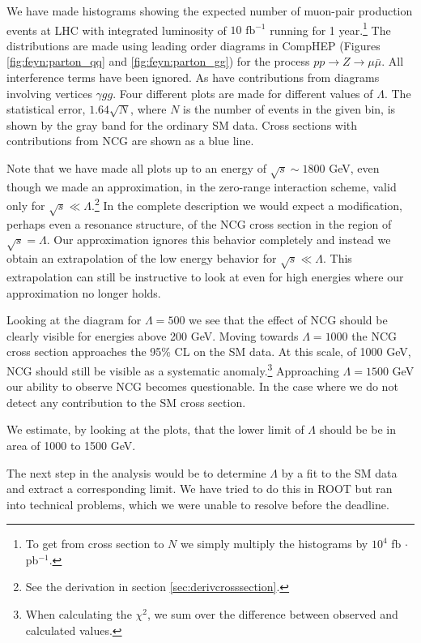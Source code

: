 We have made histograms showing the expected number of muon-pair production events at LHC with integrated luminosity of $10 \textrm{ fb}^{-1}$ running for 1 year.\footnote{To get from cross section to $N$ we simply multiply the histograms by $10^4$ fb $\cdot$ pb$^{-1}$.} The distributions are made using leading order diagrams in CompHEP (Figures \ref{fig:feyn:parton_qq} and \ref{fig:feyn:parton_gg}) for the process $pp \rightarrow Z \rightarrow \mu \bar \mu$. All interference terms have been ignored. As have contributions from diagrams involving vertices $\gamma gg$. Four different plots are made for different values of $\Lambda$. The statistical error, $1.64\sqrt{N}$, where $N$ is the number of events in the given bin, is shown by the gray band for the ordinary SM data. Cross sections with contributions from NCG are shown as a blue line.

Note that we have made all plots up to an energy of $\sqrt{s} \sim 1800$ GeV, even though we made an approximation, in the zero-range interaction scheme, valid only for $\sqrt{s} \ll \Lambda$.\footnote{See the derivation in section \ref{sec:derivcrosssection}.} In the complete description we would expect a modification, perhaps even a resonance structure, of the NCG cross section in the region of $\sqrt{s} = \Lambda$. Our approximation ignores this behavior completely and instead we obtain an extrapolation of the low energy behavior for $\sqrt{s} \ll \Lambda$. This extrapolation can still be instructive to look at even for high energies where our approximation no longer holds.

Looking at the diagram for $\Lambda = 500$ we see that the effect of NCG should be clearly visible for energies above 200 GeV. Moving towards $\Lambda = 1000$ the NCG cross section approaches the 95\% CL on the SM data. At this scale, of 1000 GeV, NCG should still be visible as a systematic anomaly.\footnote{When calculating the $\chi^2$, we sum over the difference between observed and calculated values.} Approaching $\Lambda = 1500$ GeV our ability to observe NCG becomes questionable. In the case where we do not detect any contribution to the SM cross section.

We estimate, by looking at the plots, that the lower limit of $\Lambda$ should be be in area of 1000 to 1500 GeV.

The next step in the analysis would be to determine $\Lambda$ by a fit to the SM data and extract a corresponding limit. We have tried to do this in ROOT but ran into technical problems, which we were unable to resolve before the deadline.